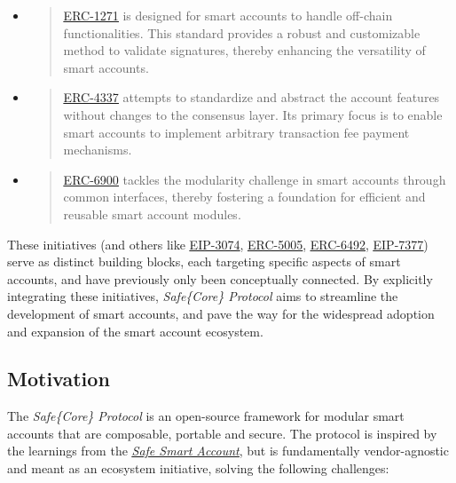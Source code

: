 \documentclass[
]{article}
\begin{document}
\begin{itemize}
  \item
        \begin{quote}
          \href{https://eips.ethereum.org/EIPS/eip-1271}{\uline{ERC-1271}} is designed for smart accounts to handle off-chain functionalities. This standard provides a robust and customizable method to validate signatures, thereby enhancing the versatility of smart accounts.
        \end{quote}
  \item
        \begin{quote}
          \href{https://eips.ethereum.org/EIPS/eip-4337}{\uline{ERC-4337}} attempts to standardize and abstract the account features without changes to the consensus layer. Its primary focus is to enable smart accounts to implement arbitrary transaction fee payment mechanisms.
        \end{quote}
  \item
        \begin{quote}
          \href{https://eips.ethereum.org/EIPS/eip-6900}{\uline{ERC-6900}} tackles the modularity challenge in smart accounts through common interfaces, thereby fostering a foundation for efficient and reusable smart account modules.
        \end{quote}
\end{itemize}

These initiatives (and others like \href{https://www.google.com/url?q=https://eips.ethereum.org/EIPS/eip-3074\&sa=D\&source=docs\ ust=1691356871166340\&usg=AOvVaw046uOovswFlDIAaeJjOeFy}{\uline{EIP-3074}}, \href{https://eips.ethereum.org/EIPS/eip-5005}{\uline{ERC-5005}}, \href{https://eips.ethereum.org/EIPS/eip-6492}{\uline{ERC-6492}}, \href{https://eips.ethereum.org/EIPS/eip-7377}{\uline{EIP-7377}}) serve as distinct building blocks, each targeting specific aspects of smart accounts, and have previously only been conceptually connected. By explicitly integrating these initiatives, \emph{Safe\{Core\} Protocol} aims to streamline the development of smart accounts, and pave the way for the widespread adoption and expansion of the smart account ecosystem.

\hypertarget{motivation}{%
  \subsection{Motivation}\label{motivation}}

The \emph{Safe\{Core\} Protocol} is an open-source framework for modular smart accounts that are composable, portable and secure. The protocol is inspired by the learnings from the \href{https://github.com/safe-global/safe-contracts}{\emph{\uline{Safe Smart Account}}}, but is fundamentally vendor-agnostic and meant as an ecosystem initiative, solving the following challenges:
\end{document}
